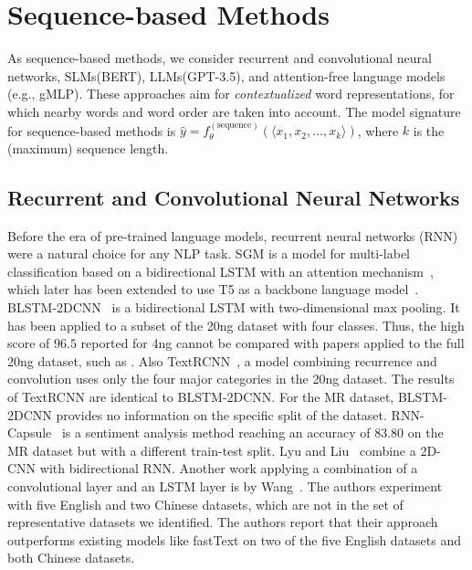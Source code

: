 \documentclass[acmsmall,nonacm]{acmart}
\newcommand{\SLMs}{SLMs\xspace}
\newcommand{\LLMs}{LLMs\xspace}
\begin{document}
\section{Sequence-based Methods}\label{sec:sequence}
As sequence-based methods, we consider recurrent and convolutional neural networks, \SLMs (\eg BERT), \LLMs (\eg GPT-3.5), and attention-free language models (e.g., gMLP). 
These approaches aim for \emph{contextualized} word representations, for which nearby words and word order are taken into account.
The model signature for sequence-based methods is
$\hat{y} = f_\theta^{(\mathrm{sequence})} ( \langle x_1, x_2, \ldots, x_k \rangle )$,
where $k$ is the (maximum) sequence length.

\subsection{Recurrent and Convolutional Neural Networks}

Before the era of pre-trained language models, recurrent neural networks (RNN) were a natural choice for any NLP task.
SGM is a model for multi-label classification based on a bidirectional LSTM with an attention mechanism~\cite{sgm}, which later has been extended to use T5 as a backbone language model~\cite{seq2tree}.
BLSTM-2DCNN~\cite{DBLP:conf/coling/ZhouQZXBX16} is a bidirectional LSTM with two-dimensional max pooling.
It has been applied to a subset of the 20ng dataset with four classes. 
Thus, the high score of $96.5$ reported for 4ng cannot be compared with papers applied to the full 20ng dataset, such as \cite{galkescherp-acl2022}.
Also Text\-RCNN~\cite{DBLP:conf/aaai/LaiXLZ15}, a model combining recurrence and convolution 
uses only the four major categories in the 20ng dataset. 
The results of Text\-RCNN are identical to BLSTM-2DCNN.
For the MR dataset, BLSTM-2DCNN provides no information on the specific split of the dataset.
RNN-Capsule~\cite{DBLP:conf/www/WangSH0Z18} is a sentiment analysis method reaching
an accuracy of $83.80$ on the MR dataset but with a different train-test split.
Lyu and Liu~\cite{DBLP:journals/corr/abs-2006-15795} combine a 2D-CNN with bidirectional RNN.
Another work applying a combination of a convolutional layer and an LSTM layer is by Wang~\etal\cite{DBLP:conf/ijcnn/WangLCCW19}. 
The authors experiment with five English and two Chinese datasets, which are not in the set of representative datasets we identified.
The authors report that their approach outperforms existing models like fastText on two of the five English datasets and both Chinese datasets. 
\end{document}

